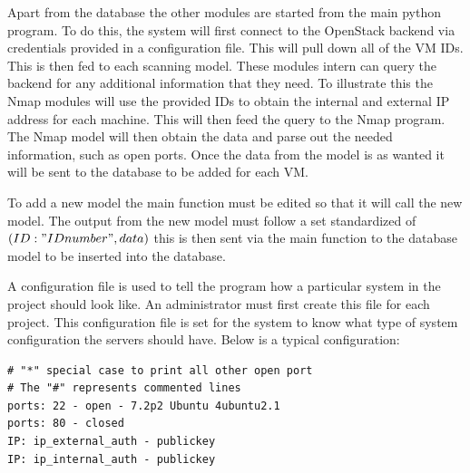 \documentclass[12pt]{article}
\begin{document}
Apart from the database the other modules are started from the main python program. To do this, the system will first connect to the OpenStack backend via credentials provided in a configuration file. This will pull down all of the VM IDs. This is then fed to each scanning model. These modules intern can query the backend for any additional information that they need. To illustrate this the Nmap modules will use the provided IDs to obtain the internal and external IP address for each machine. This will then feed the query to the Nmap program. The Nmap model will then obtain the data and parse out the needed information, such as open ports. Once the data from the model is as wanted it will be sent to the database to be added for each VM.

To add a new model the main function must be edited so that it will call the new model. The output from the new model must follow a set standardized of $(ID: "ID number", data)$ this is then sent via the main function to the database model to be inserted into the database.

A configuration file is used to tell the program how a particular system in the project should look like.  An administrator must first create this file for each project. This configuration file is set for the system to know what type of system configuration the servers should have. Below is a typical configuration:

\begin{mdframed}
    \begin{lstlisting}
# "*" special case to print all other open port
# The "#" represents commented lines
ports: 22 - open - 7.2p2 Ubuntu 4ubuntu2.1
ports: 80 - closed
IP: ip_external_auth - publickey
IP: ip_internal_auth - publickey
    \end{lstlisting}
\end{mdframed}


\begin{table}[htb]
\centering
\caption{Configuration file breakdown}
\label{}
\end{table}
\end{document}
